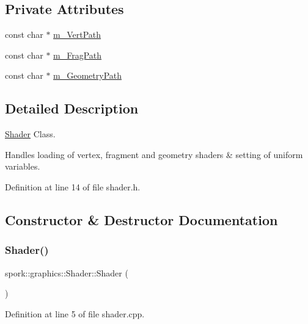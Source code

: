 \subsection*{Private Attributes}
\begin{DoxyCompactItemize}
\item 
const char $\ast$ \hyperlink{classspork_1_1graphics_1_1_shader_a2d045628a84f775d6ca5843a72511351}{m\+\_\+\+Vert\+Path}
\item 
const char $\ast$ \hyperlink{classspork_1_1graphics_1_1_shader_a87cbddb4557834f2d21023d12f3a85e7}{m\+\_\+\+Frag\+Path}
\item 
const char $\ast$ \hyperlink{classspork_1_1graphics_1_1_shader_a2e931298118049cbcbc65a62eae2b0d8}{m\+\_\+\+Geometry\+Path}
\end{DoxyCompactItemize}


\subsection{Detailed Description}
\hyperlink{classspork_1_1graphics_1_1_shader}{Shader} Class. 

Handles loading of vertex, fragment and geometry shaders \& setting of uniform variables. 

Definition at line 14 of file shader.\+h.



\subsection{Constructor \& Destructor Documentation}
\mbox{\label{classspork_1_1graphics_1_1_shader_ad07f4c0a9721d13c9a3330ccc83f8405}} 
\subsubsection{\texorpdfstring{Shader()}{Shader()}\hspace{0.1cm}{\footnotesize\ttfamily [1/2]}}
{\footnotesize\ttfamily spork\+::graphics\+::\+Shader\+::\+Shader (\begin{DoxyParamCaption}{ }\end{DoxyParamCaption})}



Definition at line 5 of file shader.\+cpp.

